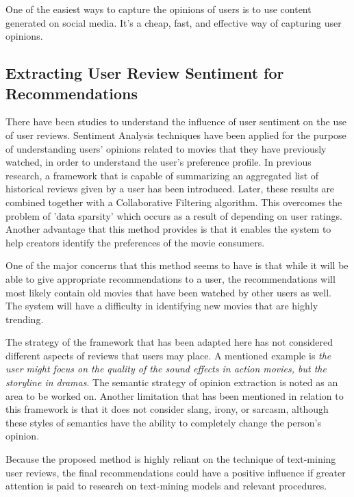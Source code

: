 \documentclass[manuscript,screen,review]{acmart}
\begin{document}
One of the easiest ways to capture the opinions of users is to use content generated on social media. It's a cheap, fast, and effective way of capturing user opinions.


\subsection{Extracting User Review Sentiment for Recommendations}
There have been studies to understand the influence of user sentiment on the use of user reviews.
Sentiment Analysis techniques have been applied for the purpose of understanding users' opinions related to movies that they have previously watched, in order to understand the user's preference profile. In previous research, \cite{cheng_hybrid_2020} a framework that is capable of summarizing an aggregated list of historical reviews given by a user has been introduced. Later, these results are combined together with a Collaborative Filtering algorithm. This overcomes the problem of 'data sparsity' which occurs as a result of depending on user ratings. 
Another advantage that this method provides is that it enables the system to help creators identify the preferences of the movie consumers.

One of the major concerns that this method seems to have is that while it will be able to give appropriate recommendations to a user, the recommendations will most likely contain old movies that have been watched by other users as well. The system will have a difficulty in identifying new movies that are highly trending.

The strategy of the framework that has been adapted here has not considered different aspects of reviews that users may place. A mentioned example is \emph{the user might focus on the quality of the sound effects in action movies, but the storyline in dramas}. The semantic strategy of opinion extraction is noted as an area to be worked on. Another limitation that has been mentioned in relation to this framework is that it does not consider slang, irony, or sarcasm, although these styles of semantics have the ability to completely change the person's opinion.

Because the proposed method is highly reliant on the technique of text-mining user reviews, the final recommendations could have a positive influence if greater attention is paid to research on text-mining models and relevant procedures.
\end{document}
